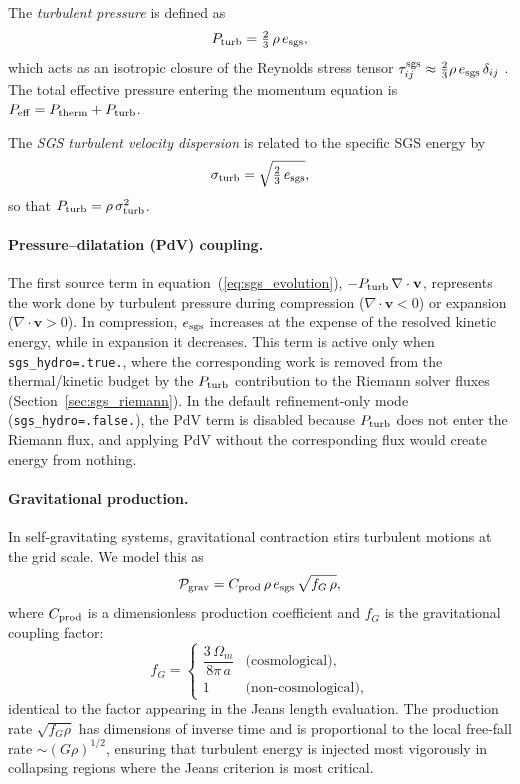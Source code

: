 \documentclass[fleqn,usenatbib]{mnras}
\newcommand{\code}[1]{\texttt{#1}}
\begin{document}
The \emph{turbulent pressure} is defined as
\begin{equation}
  P_{\rm turb} = \tfrac{2}{3}\,\rho\,e_{\rm sgs},
  \label{eq:pturb}
\end{equation}
which acts as an isotropic closure of the Reynolds stress tensor
$\tau_{ij}^{\rm sgs} \approx \frac{2}{3}\rho\,e_{\rm sgs}\,\delta_{ij}$
\citep{Schmidt2006}.  The total effective pressure entering the
momentum equation is $P_{\rm eff} = P_{\rm therm} + P_{\rm turb}$.

The \emph{SGS turbulent velocity dispersion} is related to the
specific SGS energy by
\begin{equation}
  \sigma_{\rm turb} = \sqrt{\tfrac{2}{3}\,e_{\rm sgs}},
  \label{eq:sigma_turb}
\end{equation}
so that $P_{\rm turb} = \rho\,\sigma_{\rm turb}^2$.

\paragraph{Pressure--dilatation (PdV) coupling.}
The first source term in equation~(\ref{eq:sgs_evolution}),
$-P_{\rm turb}\,\nabla\cdot\mathbf{v}$, represents the work done by
turbulent pressure during compression ($\nabla\cdot\mathbf{v} < 0$)
or expansion ($\nabla\cdot\mathbf{v} > 0$).  In compression,
$e_{\rm sgs}$ increases at the expense of the resolved kinetic energy,
while in expansion it decreases.  This term is active only when
\code{sgs\_hydro=.true.}, where the corresponding work is removed
from the thermal/kinetic budget by the $P_{\rm turb}$ contribution to
the Riemann solver fluxes (Section~\ref{sec:sgs_riemann}).  In the
default refinement-only mode (\code{sgs\_hydro=.false.}), the PdV
term is disabled because $P_{\rm turb}$ does not enter the Riemann
flux, and applying PdV without the corresponding flux would create
energy from nothing.

\paragraph{Gravitational production.}
In self-gravitating systems, gravitational contraction stirs turbulent
motions at the grid scale.  We model this as
\begin{equation}
  \mathcal{P}_{\rm grav}
    = C_{\rm prod}\,\rho\,e_{\rm sgs}\,\sqrt{f_G\,\rho},
  \label{eq:sgs_prod}
\end{equation}
where $C_{\rm prod}$ is a dimensionless production coefficient and
$f_G$ is the gravitational coupling factor:
\begin{equation}
  f_G =
  \begin{cases}
    \dfrac{3\,\Omega_m}{8\pi\,a} & \text{(cosmological),} \\[6pt]
    1 & \text{(non-cosmological),}
  \end{cases}
  \label{eq:factG}
\end{equation}
identical to the factor appearing in the Jeans length evaluation.  The
production rate $\sqrt{f_G\rho}$ has dimensions of inverse time and
is proportional to the local free-fall rate $\sim (G\rho)^{1/2}$,
ensuring that turbulent energy is injected most vigorously in
collapsing regions where the Jeans criterion is most critical.
\end{document}
